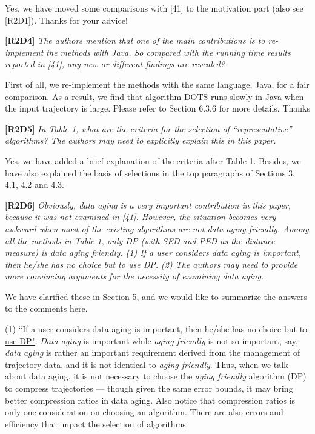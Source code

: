 \documentclass{letter}
\begin{document}
{Yes, we have moved some comparisons with [41] to the motivation part (also see [R2D1]). Thanks for your advice!

\textbf{[R2D4]} \emph{The authors mention that one of the main contributions is to re-implement the methods with Java. So compared with the running time results reported in [41], any new or different findings are revealed?}

First of all, we re-implement the methods with the same language, Java, for a fair comparison.
As a result, we find that algorithm DOTS runs slowly in Java when the input trajectory is large.
Please refer to Section 6.3.6 for more details. Thanks


\textbf{[R2D5]} \emph{In Table 1, what are the criteria for the selection of “representative” algorithms? The authors may need to explicitly explain this in this paper.}

Yes, we have added a brief explanation of the criteria after Table 1. Besides, we have also explained the basis of selections in the top paragraphs of Sections 3, 4.1, 4.2 and 4.3.

\textbf{[R2D6]} \emph{Obviously, data aging is a very important contribution in this paper, because it was not examined in [41]. However, the situation becomes very awkward when most of the existing algorithms are not data aging friendly. Among all the methods in Table 1, only DP (with SED and PED as the distance measure) is data aging friendly. (1) {If a user considers data aging is important, then he/she has no choice but to use DP}. (2) {The authors may need to provide more convincing arguments for the necessity of examining data aging}.}

We have clarified these in Section 5, and we would like to summarize the answers to the comments here.

(1) \underline{``If a user considers data aging is important, then he/she has no choice but to use DP"}: \emph{Data aging} is important while \emph{aging friendly} is not so important, say, \emph{data aging} is rather an important requirement derived from the management of trajectory data, and it is not identical to \emph{aging friendly}. Thus, when we talk about data aging, it is not necessary to choose the \emph{aging friendly} algorithm (DP) to compress trajectories --- though given the same error bounds, it may bring better compression ratios in data aging. Also notice that compression ratios is only one consideration on choosing an algorithm. There are also errors and efficiency that impact the selection of algorithms.

}
\end{document}
